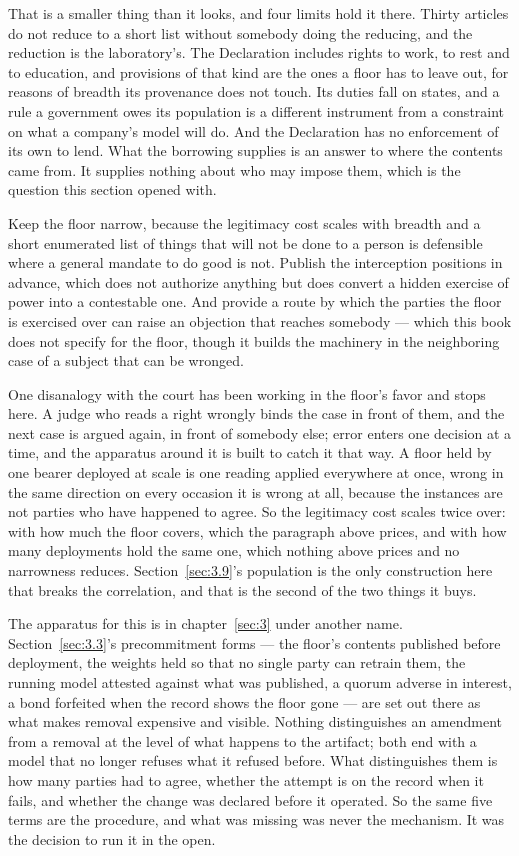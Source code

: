 That is a smaller thing than it looks, and four limits hold it there. Thirty articles do not reduce to a short list without somebody doing the reducing, and the reduction is the laboratory’s. The Declaration includes rights to work, to rest and to education, and provisions of that kind are the ones a floor has to leave out, for reasons of breadth its provenance does not touch. Its duties fall on states, and a rule a government owes its population is a different instrument from a constraint on what a company’s model will do. And the Declaration has no enforcement of its own to lend. What the borrowing supplies is an answer to where the contents came from. It supplies nothing about who may impose them, which is the question this section opened with.

Keep the floor narrow, because the legitimacy cost scales with breadth and a short enumerated list of things that will not be done to a person is defensible where a general mandate to do good is not. Publish the interception positions in advance, which does not authorize anything but does convert a hidden exercise of power into a contestable one. And provide a route by which the parties the floor is exercised over can raise an objection that reaches somebody — which this book does not specify for the floor, though it builds the machinery in the neighboring case of a subject that can be wronged.

One disanalogy with the court has been working in the floor's favor and stops here. A judge who reads a right wrongly binds the case in front of them, and the next case is argued again, in front of somebody else; error enters one decision at a time, and the apparatus around it is built to catch it that way. A floor held by one bearer deployed at scale is one reading applied everywhere at once, wrong in the same direction on every occasion it is wrong at all, because the instances are not parties who have happened to agree. So the legitimacy cost scales twice over: with how much the floor covers, which the paragraph above prices, and with how many deployments hold the same one, which nothing above prices and no narrowness reduces. Section~\ref{sec:3.9}'s population is the only construction here that breaks the correlation, and that is the second of the two things it buys.

The apparatus for this is in chapter~\ref{sec:3} under another name. Section~\ref{sec:3.3}'s precommitment forms — the floor's contents published before deployment, the weights held so that no single party can retrain them, the running model attested against what was published, a quorum adverse in interest, a bond forfeited when the record shows the floor gone — are set out there as what makes removal expensive and visible. Nothing distinguishes an amendment from a removal at the level of what happens to the artifact; both end with a model that no longer refuses what it refused before. What distinguishes them is how many parties had to agree, whether the attempt is on the record when it fails, and whether the change was declared before it operated. So the same five terms are the procedure, and what was missing was never the mechanism. It was the decision to run it in the open.

